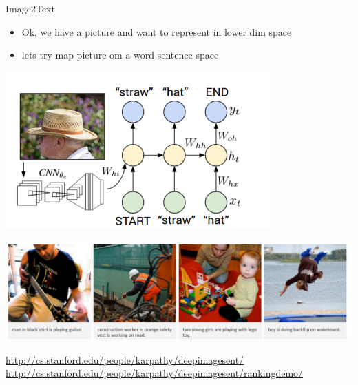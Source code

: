 \documentclass{beamer}
\begin{document}
\begin{frame}{Image2Text}
	\begin{itemize}
		\item Ok, we have a picture and want to represent in lower dim space
		\item lets try map picture om a word sentence space
	\end{itemize}
	\begin{center}
		\includegraphics[scale=0.3]{img/nt}
		
		\includegraphics[scale=0.3]{img/ntw}
	\end{center}

	\href{http://cs.stanford.edu/people/karpathy/deepimagesent/}{http://cs.stanford.edu/people/karpathy/deepimagesent/}
	\href{http://cs.stanford.edu/people/karpathy/deepimagesent/rankingdemo/}{http://cs.stanford.edu/people/karpathy/deepimagesent/rankingdemo/}
\end{frame}
\end{document}
